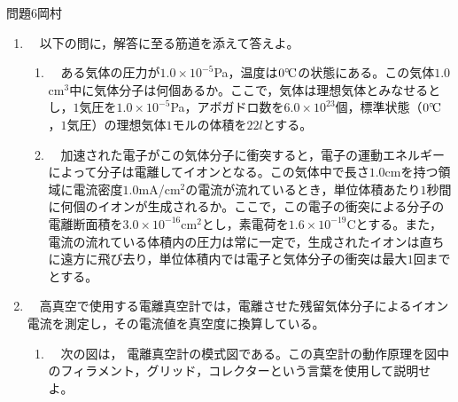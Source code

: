 \documentclass[fleqn]{jbook}
\begin{document}

\begin{question}{問題6}{岡村}
\setcounter{equation}{0}

\begin{enumerate}

  \item 　以下の問に，解答に至る筋道を添えて答えよ。\\
  
  \begin{enumerate}
  
    \item 　ある気体の圧力が$1.0\times10^{-5}$Pa，温度は$0^{\circ}\!\rm C$の状態にある。この気体$1.0$cm$^3$中に気体分子は何個あるか。ここで，気体は理想気体とみなせるとし，$1$気圧を$1.0\times10^{-5}$Pa，アボガドロ数を$6.0\times10^{23}$個，標準状態（$0^{\circ}\!\rm C$，$1$気圧）の理想気体$1$モルの体積を$22l$とする。\\
    
    \item 　加速された電子がこの気体分子に衝突すると，電子の運動エネルギーによって分子は電離してイオンとなる。この気体中で長さ$1.0$cmを持つ領域に電流密度$1.0$mA/cm$^2$の電流が流れているとき，単位体積あたり$1$秒間に何個のイオンが生成されるか。ここで，この電子の衝突による分子の電離断面積を$3.0\times10^{-16}$cm$^2$とし，素電荷を$1.6\times10^{-19}$Cとする。また，電流の流れている体積内の圧力は常に一定で，生成されたイオンは直ちに遠方に飛び去り，単位体積内では電子と気体分子の衝突は最大$1$回までとする。\\
    
\end{enumerate}

  \item 　高真空で使用する電離真空計では，電離させた残留気体分子によるイオン電流を測定し，その電流値を真空度に換算している。\\
  
    \begin{enumerate}
    
    \item 　次の図は，%
    電離真空計の模式図である。この真空計の動作原理を図中のフィラメント，グリッド，コレクターという言葉を使用して説明せよ。
\begin{figure}[hbt]
\begin{center}

\vfill
\end{center}
\end{figure}
    

\end{enumerate}
\end{enumerate}
\end{question}
\end{document}
